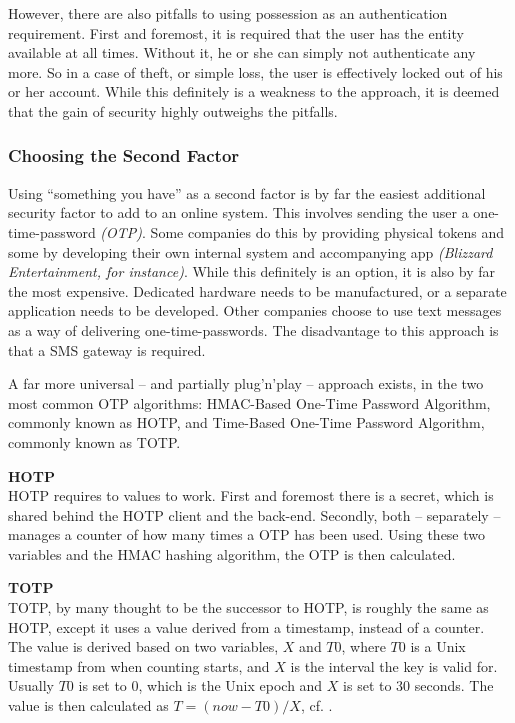 			However, there are also pitfalls to using possession as an authentication requirement. First and foremost, it is required that the user has the entity available at all times. Without it, he or she can simply not authenticate any more. So in a case of theft, or simple loss, the user is effectively locked out of his or her account. While this definitely is a weakness to the approach, it is deemed that the gain of security highly outweighs the pitfalls.

			\subsubsection{Choosing the Second Factor}
				Using ``something you have'' as a second factor is by far the easiest additional security factor to add to an online system. This involves sending the user a one-time-password \emph{(OTP)}. Some companies do this by providing physical tokens and some by developing their own internal system and accompanying app \emph{(Blizzard Entertainment, for instance)}. While this definitely is an option, it is also by far the most expensive. Dedicated hardware needs to be manufactured, or a separate application needs to be developed. Other companies choose to use text messages as a way of delivering one-time-passwords. The disadvantage to this approach is that a SMS gateway is required.

				A far more universal -- and partially plug'n'play -- approach exists, in the two most common OTP algorithms: HMAC-Based One-Time Password Algorithm\cite{rfc4226}, commonly known as HOTP, and Time-Based One-Time Password Algorithm\cite{rfc6238}, commonly known as TOTP. 

				\textbf{HOTP}\\
				HOTP requires to values to work. First and foremost there is a secret, which is shared behind the HOTP client and the back-end. Secondly, both -- separately -- manages a counter of how many times a OTP has been used. Using these two variables and the HMAC hashing algorithm, the OTP is then calculated. 

				\textbf{TOTP}\\
				TOTP, by many thought to be the successor to HOTP, is roughly the same as HOTP, except it uses a value derived from a timestamp, instead of a counter. The value is derived based on two variables, $X$ and $T0$, where $T0$ is a Unix timestamp from when counting starts, and $X$ is the interval the key is valid for. Usually $T0$ is set to $0$, which is the Unix epoch and $X$ is set to $30$ seconds. The value is then calculated as $T = (now - T0)/X$, cf. \cite[Sec. 4.2]{rfc6238}.

